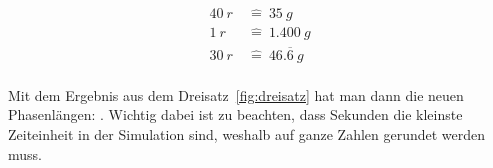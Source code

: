\begin{align}
    40~\unit{r}~&\widehat{=}~35~\unit{g} \\
    1~\unit{r}~&\widehat{=}~1.400~\unit{g} \\
    30~\unit{r}~&\widehat{=}~46.\overline{6}~\unit{g} \\
    \label{fig:dreisatz}
\end{align}

Mit dem Ergebnis aus dem Dreisatz~\ref{fig:dreisatz} hat man dann die neuen Phasenlängen: .
Wichtig dabei ist zu beachten, dass Sekunden die kleinste Zeiteinheit in der Simulation sind, weshalb auf ganze Zahlen gerundet werden muss.
